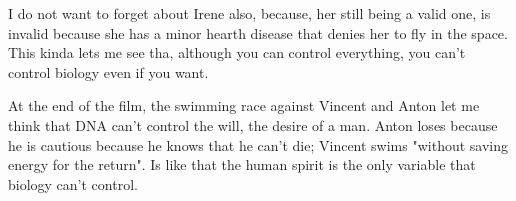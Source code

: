 I do not want to forget about Irene also, because, her still being a valid one, is invalid because she has a minor hearth disease that denies her to fly in the space. This kinda lets me see tha, although you can control everything, you can't control biology even if you want.

At the end of the film, the swimming race against Vincent and Anton let me think that DNA can't control the will, the desire of a man. Anton loses because he is cautious because he knows that he can't die; Vincent swims "without saving energy for the return". Is like that the human spirit is the only variable that biology can't control.